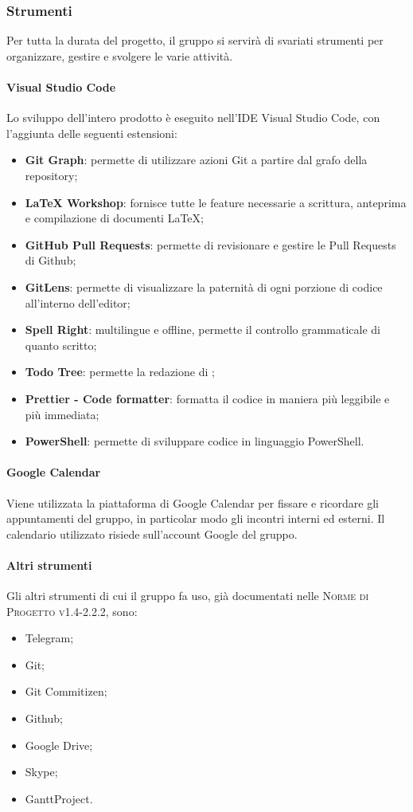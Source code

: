 \documentclass[../norme-di-progetto.tex]{subfiles}
\begin{document}
\subsubsection{Strumenti}
Per tutta la durata del progetto, il gruppo si servirà di svariati strumenti per organizzare, gestire e svolgere le varie attività.
\paragraph{Visual Studio Code}
Lo sviluppo dell'intero prodotto è eseguito nell'IDE Visual Studio Code, con l'aggiunta delle seguenti estensioni:
\begin{itemize}
  \item \textbf{Git Graph}: permette di utilizzare azioni Git a partire dal grafo della repository;
  \item \textbf{LaTeX Workshop}: fornisce tutte le feature necessarie a scrittura, anteprima e compilazione di documenti \LaTeX;
  \item \textbf{GitHub Pull Requests}: permette di revisionare e gestire le Pull Requests di Github;
  \item \textbf{GitLens}: permette di visualizzare la paternità di ogni porzione di codice all'interno dell'editor;
  \item \textbf{Spell Right}:  multilingue e offline, permette il controllo grammaticale di quanto scritto;
  \item \textbf{Todo Tree}: permette la redazione di ;
  \item \textbf{Prettier - Code formatter}: formatta il codice in maniera più leggibile e più immediata;
  \item \textbf{PowerShell}: permette di sviluppare codice in linguaggio PowerShell.
\end{itemize}

\paragraph{Google Calendar}
Viene utilizzata la piattaforma di Google Calendar per fissare e ricordare gli appuntamenti del gruppo, in particolar modo gli incontri interni ed esterni. Il calendario utilizzato risiede sull'account Google del gruppo.

\paragraph{Altri strumenti}
Gli altri strumenti di cui il gruppo fa uso, già documentati nelle \textsc{Norme di Progetto v1.4-2.2.2}, sono:
\begin{itemize}
  \item Telegram;
  \item Git;
  \item Git Commitizen;
  \item Github;
  \item Google Drive;
  \item Skype;
  \item GanttProject.
\end{itemize}
\end{document}
